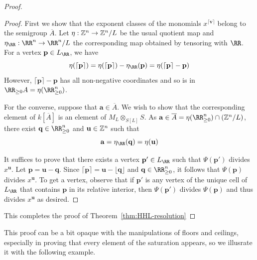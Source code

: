 \documentclass{amsart}
\begin{document}
\begin{proof}
\begin{proof}
  First we show that the exponent classes of the monomials $x^{\lceil \mathbf{v}\rceil}$ belong to the semigroup $\overline{A}$.
  Let $\eta:\mathbb Z^n\rightarrow \mathbb Z^n/L$ be the usual quotient map and $\eta_{\RR}:\RR^n\rightarrow \RR^n/L$ the corresponding map obtained by tensoring with $\RR$. For a vertex $\mathbf{p}\in L_{\RR}$, we have
  \[\eta(\lceil \mathbf{p}\rceil) = \eta(\lceil \mathbf{p}\rceil)-\eta_{\RR}(\mathbf{p}) = \eta(\lceil \mathbf{p}\rceil - \mathbf{p})\]
  However, $\lceil \mathbf{p}\rceil - \mathbf{p}$ has all non-negative coordinates and so is in $\RR_{\geq 0} A=\eta(\RR_{\geq 0}^n)$.

  For the converse, suppose that $\mathbf{a}\in \overline{A}$. We wish to show that the corresponding element of $k[\overline{A}]$ is an element of $M_L\otimes_{S[L]} S$.
  As $\mathbf{a}\in \overline{A} = \eta(\RR_{\geq 0}^n)\cap (\ZZ^n/L)$, there exist
  $\mathbf{q}\in \RR_{\geq 0}^n$ and $\mathbf{u}\in \mathbb Z^n$ such that
  \[\mathbf{a} = \eta_{\RR}(\mathbf{q}) = \eta(\mathbf{u})\]

  It suffices to prove that there exists a vertex $\mathbf{p}'\in L_{\RR}$ such that $\Psi(\mathbf{p}')$ divides $x^{\mathbf{u}}$.
  Let $\mathbf{p}=\mathbf{u}-\mathbf{q}$. Since $\lceil \mathbf{p} \rceil = \mathbf{u} - \lfloor \mathbf{q}\rfloor$ and $\mathbf{q}\in \RR_{\geq 0}^n$, it follows that $\Psi(\mathbf{p})$ divides $x^{\mathbf{u}}$. To get a vertex, observe that if $\mathbf{p}'$ is any vertex of the unique cell of $L_{\RR}$ that contains $\mathbf{p}$ in its relative interior, then $\Psi(\mathbf{p}')$ divides $\Psi(\mathbf{p})$ and thus divides $x^{\mathbf{u}}$ as desired.
\end{proof}

 This completes the proof of Theorem~\ref{thm:HHL-resolution}
 \end{proof}

This proof can be a bit opaque with the manipulations of floors and ceilings, especially in proving that every element of the saturation appears, so we illusrate it with the following example.
  
\end{document}
